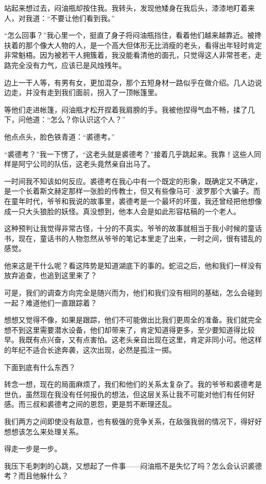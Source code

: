 站起来想过去，闷油瓶却按住我。我转头，发现他矮身在我后头，漆漆地盯着来人，对我道：“不要让他们看到我。”

“怎么回事？”我心里一个，挺直了身子将闷油瓶挡住，看着他们越来越靠近。被搀扶着的那个像大人物的人，是一个高大但体形无比消瘦的老头，看得出年轻时肯定非常魁梧。因为被若干人拥簇着，我没能看清他的面孔，只觉得这人非常苍老，走路完全没有力气，应该已是风烛残年。

边上一干人等，有男有女，更加混杂，那个五短身材一路似乎在做介绍。几人边说边走，并没有走到我们面前，拐入了一顶帐篷里。

等他们走进帐篷，闷油瓶才松开捏着我肩膀的手。我被他捏得气血不畅，揉了几下，问他道：“怎么？你认识这个人？”

他点点头，脸色铁青道：“裘德考。”

“裘德考？”我一下愣了，“这老头就是裘德考？”接着几乎跳起来。我靠！这些人同样是阿宁公司的队伍，这老头竟然亲自出马了。

一时间我不知该如何反应。裘德考在我心中有一个既定的形象，既确定又不确定，是一个长着斯文赫定那样一张脸的传教士，但又有些像马可·波罗那个大骗子。而在童年时代，爷爷和我说的故事里，裘德考是一个最坏的坏蛋，我还曾经把他想像成一只大头狼脸的妖怪。真没想到，他本人会是如此形容枯稿的一个老人。

这种预判让我觉得非常古怪，十分的不真实。爷爷的故事就相当于我小时候的童话书，现在，童话书的人物忽然从爷爷的笔记本里走了出来，一时之间，很有错乱的感觉。

他来这是干什么呢？看这阵势是知道湖底下的事的。蛇沼之后，他和我们一样没有放弃追查，也追到这里来了？

可是，我们的调查方向完全是随兴而为，他们和我们没有相同的基础，怎么会碰到一起？难道他们一直跟踪着？

想想又觉得不像，如果是跟踪，他们不可能做出比我们更周全的准备。我们就完全想不到这里需要潜水设备，他们却带来了，肯定知道得更多，至少要知道得比较早。我既有点兴奋，又有点害怕。这老头亲自出现在这里，肯定非同小可。他这样的年纪不适合长途奔袭，这次出现，必然是孤注一掷。

下面到底有什么东西？

转念一想，现在的局面麻烦了，我们和他们的关系太复杂了。我的爷爷和裘德考是世仇，虽然现在我没有任何报仇的想法，但这层关系让我不可能对他们有任何好感。而三叔和裘德考之间的恩怨，更是剪不断理还乱。

我们两方之间即使没有敌意，也有极强的竞争关系，在敌强我弱的情况下，得好好想想该怎么来处理关系。

得走一步是一步。

我压下毛刺刺的心跳，又想起了一件事——闷油瓶不是失忆了吗？怎么会认识裘德考？而且他躲什么？

